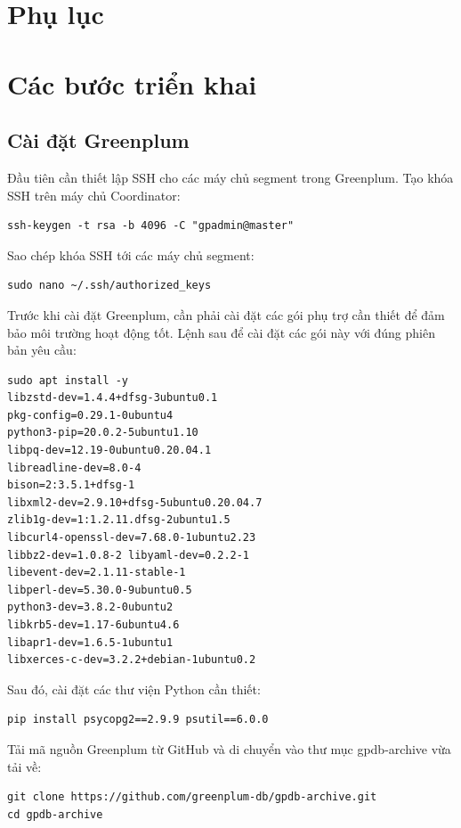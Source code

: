 \documentclass{article}[14pt]
\begin{document}
\section{Phụ lục}
\appendix

\section{Các bước triển khai}

\subsection{Cài đặt Greenplum}

Đầu tiên cần thiết lập SSH cho các máy chủ segment trong Greenplum.
Tạo khóa SSH trên máy chủ Coordinator:

\begin{verbatim}
ssh-keygen -t rsa -b 4096 -C "gpadmin@master"
\end{verbatim}

Sao chép khóa SSH tới các máy chủ segment:


\begin{verbatim}
sudo nano ~/.ssh/authorized_keys
\end{verbatim}

Trước khi cài đặt Greenplum, cần phải cài đặt các gói phụ trợ cần thiết để đảm bảo môi trường hoạt động tốt. Lệnh sau để cài đặt các gói này với đúng phiên bản yêu cầu:
\begin{verbatim}
sudo apt install -y 
libzstd-dev=1.4.4+dfsg-3ubuntu0.1
pkg-config=0.29.1-0ubuntu4
python3-pip=20.0.2-5ubuntu1.10
libpq-dev=12.19-0ubuntu0.20.04.1
libreadline-dev=8.0-4
bison=2:3.5.1+dfsg-1
libxml2-dev=2.9.10+dfsg-5ubuntu0.20.04.7
zlib1g-dev=1:1.2.11.dfsg-2ubuntu1.5
libcurl4-openssl-dev=7.68.0-1ubuntu2.23
libbz2-dev=1.0.8-2 libyaml-dev=0.2.2-1
libevent-dev=2.1.11-stable-1
libperl-dev=5.30.0-9ubuntu0.5
python3-dev=3.8.2-0ubuntu2
libkrb5-dev=1.17-6ubuntu4.6
libapr1-dev=1.6.5-1ubuntu1
libxerces-c-dev=3.2.2+debian-1ubuntu0.2
\end{verbatim}

Sau đó, cài đặt các thư viện Python cần thiết:

\begin{verbatim}
pip install psycopg2==2.9.9 psutil==6.0.0
\end{verbatim}

Tải mã nguồn Greenplum từ GitHub và di chuyển vào thư mục gpdb-archive vừa tải về:

\begin{verbatim}
git clone https://github.com/greenplum-db/gpdb-archive.git
cd gpdb-archive
\end{verbatim}
\end{document}
